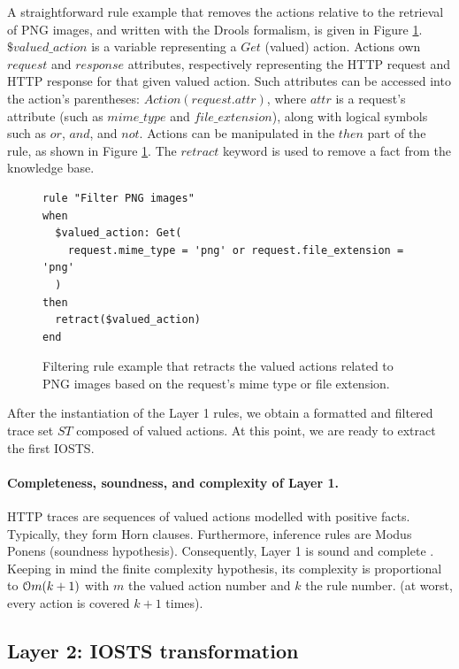 A straightforward rule example that removes the actions relative
to the retrieval of PNG images, and written with the Drools
formalism, is given in Figure \ref{fig:layer1:filter}.
$\$valued\_action$ is a variable representing a $Get$ (valued)
action.  Actions own $request$ and $response$ attributes,
respectively representing the HTTP request and HTTP response for
that given valued action. Such attributes can be accessed into
the action's parentheses: $Action(request.attr)$, where $attr$ is
a request's attribute (such as $mime\_type$ and
$file\_extension$), along with logical symbols such as $or$,
$and$, and $not$. Actions can be manipulated in the $then$ part
of the rule, as shown in Figure \ref{fig:layer1:filter}. The
$retract$ keyword is used to remove a fact from the knowledge
base.

\begin{figure}[ht]
\begin{framed}
\begin{BVerbatim}
rule "Filter PNG images"
when
  $valued_action: Get(
    request.mime_type = 'png' or request.file_extension = 'png'
  )
then
  retract($valued_action)
end
\end{BVerbatim}
\end{framed}

    \caption{Filtering rule example that retracts the valued actions
    related to PNG images based on the request's mime type or
    file extension.}
    \label{fig:layer1:filter}
\end{figure}

After the instantiation of the Layer 1 rules, we obtain a
formatted and filtered trace set $ST$ composed of valued actions.
At this point, we are ready to extract the first IOSTS.

\paragraph{Completeness, soundness, and complexity of Layer 1.}

HTTP traces are sequences of valued actions modelled with
positive facts. Typically, they form Horn clauses. Furthermore,
inference rules are Modus Ponens (soundness hypothesis).
Consequently, Layer 1 is sound and complete \cite{logicreasoning}.
Keeping in mind the finite complexity hypothesis, its complexity
is proportional to $\EuScript{O}m(k+1)$ with $m$ the valued
action number and $k$ the rule number. (at worst, every action is
covered $k+1$ times).

\subsection{Layer 2: IOSTS transformation}
\label{sec:modelinf:webapps:L2}


